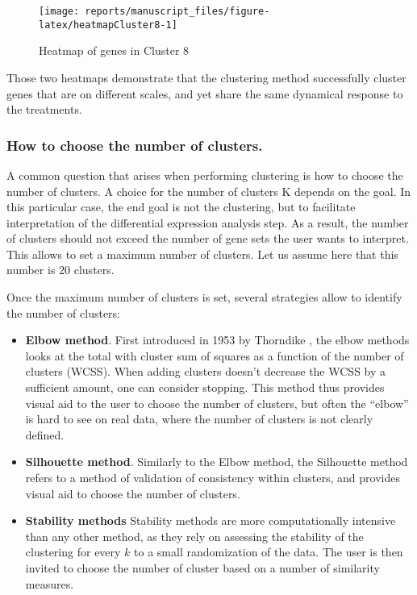 \documentclass[9pt,a4paper,]{extarticle}
\begin{document}
\begin{figure}[H]

{\centering \texttt{[image: reports/manuscript\_files/figure-latex/heatmapCluster8-1]} 

}

\caption{Heatmap of genes in Cluster 8}\label{fig:heatmapCluster8}
\end{figure}

Those two heatmaps demonstrate that the clustering method successfully cluster
genes that are on different scales, and yet share the same dynamical response
to the treatments.

\hypertarget{how-to-choose-the-number-of-clusters.}{%
\subsubsection{How to choose the number of clusters.}\label{how-to-choose-the-number-of-clusters.}}

A common question that arises when performing clustering is how to choose the
number of clusters. A choice for the number of clusters K depends on the goal.
In this particular case, the end goal is not the clustering, but to facilitate
interpretation of the differential expression analysis step. As a result, the
number of clusters should not exceed the number of gene sets the user wants to
interpret. This allows to set a maximum number of clusters. Let us assume here
that this number is 20 clusters.

Once the maximum number of clusters is set, several strategies allow to
identify the number of clusters:

\begin{itemize}
\tightlist
\item
  \textbf{Elbow method}. First introduced in 1953 by Thorndike \citep{thorndike:who},
  the elbow methods looks at the total with cluster sum of squares
  as a function of the number of clusters (WCSS). When adding clusters
  doesn't decrease the WCSS by a sufficient
  amount, one can consider stopping. This method thus provides visual aid to
  the user to choose the number of clusters, but often the ``elbow'' is hard to
  see on real data, where the number of clusters is not clearly defined.
\item
  \textbf{Silhouette method}. Similarly to the Elbow method, the Silhouette method
  refers to a method of validation of consistency within clusters, and
  provides visual aid to choose the number of clusters.
\item
  \textbf{Stability methods} Stability methods are more computationally intensive
  than any other method, as they rely on assessing the stability of the
  clustering for every \(k\) to a small randomization of the data. The user is
  then invited to choose the number of cluster based on a number of similarity
  measures.
\end{itemize}
\end{document}
